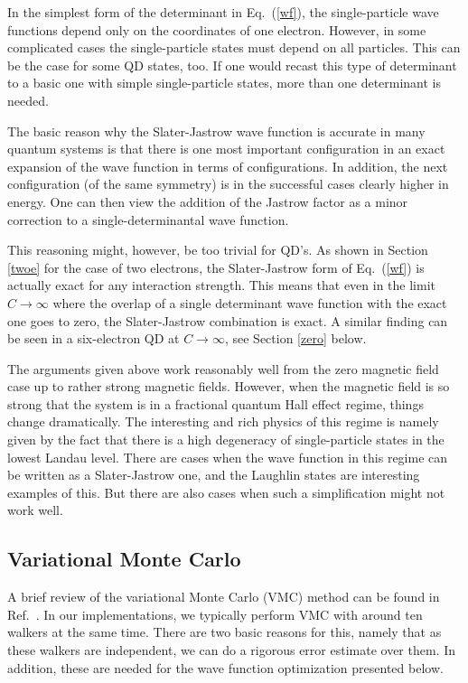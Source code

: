 \documentclass{article}
\begin{document}
In the simplest form of the determinant in Eq.~(\ref{wf}), the
single-particle wave functions depend only on the coordinates of one
electron. However, in some complicated cases the single-particle
states must depend on all particles. This can be the case for some QD
states, too. If one would recast this type of determinant to a basic
one with simple single-particle states, more than one determinant is
needed.

The basic reason why the Slater-Jastrow wave function is accurate in
many quantum systems is that there is one most important configuration
in an exact expansion of the wave function in terms of configurations.
In addition, the next configuration (of the same symmetry) is in the
successful cases clearly higher in energy. One can then view the
addition of the Jastrow factor as a minor correction to a
single-determinantal wave function.

This reasoning might, however, be too trivial for QD's. As shown in
Section \ref{twoe} for the case of two electrons, the Slater-Jastrow
form of Eq.~(\ref{wf}) is actually exact for any interaction
strength. This means that even in the limit $C\to \infty$ where the
overlap of a single determinant wave function with the exact one goes
to zero, the Slater-Jastrow combination is exact. A similar finding
can be seen in a six-electron QD at $C\to \infty$, see Section
\ref{zero} below.

The arguments given above work reasonably well from the zero magnetic
field case up to rather strong magnetic fields. However, when the
magnetic field is so strong that the system is in a fractional quantum
Hall effect regime, things change dramatically. The interesting and
rich physics of this regime is namely given by the fact that there is
a high degeneracy of single-particle states in the lowest Landau
level. There are cases when the wave function in this regime can be
written as a Slater-Jastrow one, and the Laughlin states are
interesting examples of this\cite{Laughlin_13}. But there are also
cases when such a simplification might not work well.

\subsection{Variational Monte Carlo}

A brief review of the variational Monte Carlo (VMC) method can be
found in Ref.~. In our implementations, we
typically perform VMC with around ten walkers at the same time. There
are two basic reasons for this, namely that as these walkers are
independent, we can do a rigorous error estimate over them. In
addition, these are needed for the wave function optimization
presented below.
\end{document}
